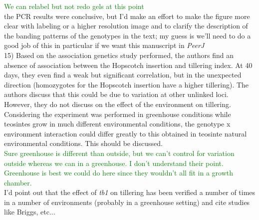 \documentclass[11pt]{article}
\newcommand{\lev}[1]{\noindent \textcolor{green}{{#1}} \\}
\newcommand{\mbh}[1]{\noindent \textcolor{Dandelion}{{#1}}\\}
\begin{document}
\lev{We can relabel but not redo gels at this point}
\mbh{the PCR results were conclusive, but I'd make an effort to make the figure more clear with labeling or a higher resolution image and to clarify the description of the banding patterns of the genotypes in the text; my guess is we'll need to do a good job of this in particular if we want this manuscript in \emph{PeerJ}}  

15) Based on the association genetics study performed, the authors find an absence of association between the Hopscotch insertion and tillering index. At 40 days, they even find a weak but significant correlation, but in the unexpected direction (homozygotes for the Hopscotch insertion have a higher tillering). The authors discuss that this could be due to variation at other unlinked loci. However, they do not discuss on the effect of the environment on tillering. Considering the experiment was performed in greenhouse conditions while teosintes grow in much different environmental conditions, the genotype x environment interaction could differ greatly to this obtained in teosinte natural environmental conditions. This should be discussed.\\

\lev{Sure greenhouse is different than outside, but we can't control for variation outside whereas we can in a greenhouse. I don't understand their point. Greenhouse is best we could do here since they wouldn't all fit in a growth chamber.}

\mbh{I'd point out that the effect of \emph{tb1} on tillering has been verified a number of times in a number of environments (probably in a greenhouse setting) and cite studies like Briggs, etc...}


\end{document}
